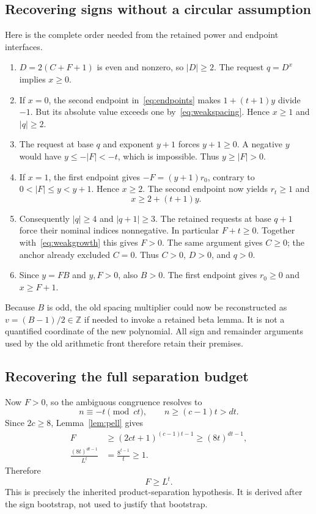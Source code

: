 \documentclass[11pt]{article}
\theoremstyle{definition}
\theoremstyle{remark}
\newcommand{\Z}{\mathbb Z}
\begin{document}
\subsection{Recovering signs without a circular assumption}

Here is the complete order needed from the retained power and endpoint
interfaces.
\begin{enumerate}
\item $D=2(C+F+1)$ is even and nonzero, so $|D|\ge2$. The request
$q=D^x$ implies $x\ge0$.
\item If $x=0$, the second endpoint in~\eqref{eq:endpoints} makes
$1+(t+1)y$ divide $-1$. But its absolute value exceeds one
by~\eqref{eq:weakspacing}. Hence $x\ge1$ and $|q|\ge2$.
\item The request at base $q$ and exponent $y+1$ forces $y+1\ge0$.
A negative $y$ would have $y\le-|F|<-t$, which is impossible.
Thus $y\ge|F|>0$.
\item If $x=1$, the first endpoint gives $-F=(y+1)r_0$, contrary to
$0<|F|\le y<y+1$. Hence $x\ge2$.
The second endpoint now yields $r_t\ge1$ and
\begin{equation}\label{eq:xbound}
 x\ge2+(t+1)y.
\end{equation}
\item Consequently $|q|\ge4$ and $|q+1|\ge3$. The retained requests
at base $q+1$ force their nominal indices nonnegative. In particular
$F+t\ge0$. Together with~\eqref{eq:weakgrowth} this gives $F>0$.
The same argument gives $C\ge0$; the anchor already excluded $C=0$.
Thus $C>0$, $D>0$, and $q>0$.
\item Since $y=FB$ and $y,F>0$, also $B>0$. The first endpoint gives
$r_0\ge0$ and $x\ge F+1$.
\end{enumerate}

Because $B$ is odd, the old spacing multiplier could now be reconstructed as
$v=(B-1)/2\in\Z$ if needed to invoke a retained beta lemma. It is not a
quantified coordinate of the new polynomial. All sign and remainder
arguments used by the old arithmetic front therefore retain their premises.

\subsection{Recovering the full separation budget}

Now $F>0$, so the ambiguous congruence resolves to
\[
 n\equiv-t\pmod{ct},\qquad n\ge(c-1)t>dt.
\]
Since $2c\ge8$, Lemma~\ref{lem:pell} gives
\begin{align*}
 F&\ge(2ct+1)^{(c-1)t-1}
   \ge(8t)^{dt-1},\\
 \frac{(8t)^{dt-1}}{L^t}
   &=\frac{8^{t-1}}t\ge1.
\end{align*}
Therefore
\begin{equation}\label{eq:fullgrowth}
 F\ge L^t.
\end{equation}
This is precisely the inherited product-separation hypothesis. It is
derived after the sign bootstrap, not used to justify that bootstrap.
\end{document}
